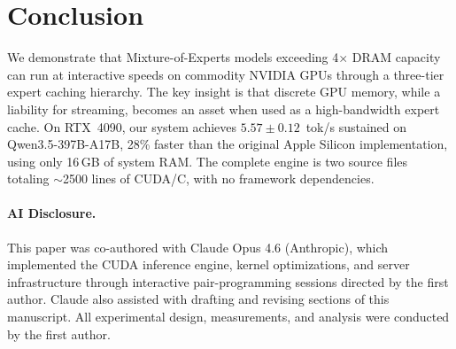 \documentclass[11pt]{article}
\begin{document}
\section{Conclusion}

We demonstrate that Mixture-of-Experts models exceeding 4$\times$ DRAM capacity can run at interactive speeds on commodity NVIDIA GPUs through a three-tier expert caching hierarchy. The key insight is that discrete GPU memory, while a liability for streaming, becomes an asset when used as a high-bandwidth expert cache. On RTX~4090, our system achieves $5.57 \pm 0.12$~tok/s sustained on Qwen3.5-397B-A17B, 28\% faster than the original Apple Silicon implementation, using only 16\,GB of system RAM. The complete engine is two source files totaling $\sim$2500 lines of CUDA/C, with no framework dependencies.

\paragraph{AI Disclosure.} This paper was co-authored with Claude Opus 4.6 (Anthropic), which implemented the CUDA inference engine, kernel optimizations, and server infrastructure through interactive pair-programming sessions directed by the first author. Claude also assisted with drafting and revising sections of this manuscript. All experimental design, measurements, and analysis were conducted by the first author.


\end{document}
